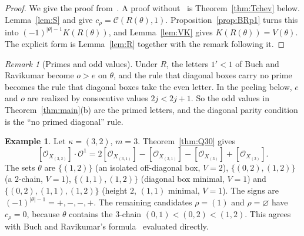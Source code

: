 \documentclass[11pt]{amsart}
\theoremstyle{definition}
\newtheorem{example}[theorem]{Example}
\theoremstyle{remark}
\newtheorem{remark}[theorem]{Remark}
\newcommand{\cO}{\mathcal{O}}
\newcommand{\cC}{\mathcal{C}}
\begin{document}
\begin{proof}
We give the proof from~\cite{BR12}. A proof without~\cite{BR12} is Theorem~\ref{thm:Tchev} below.
Lemma~\ref{lem:S} and \cite[Cor.~5.4]{BR12} give $c_\rho=\cC(R(\theta),1)$.
Proposition~\ref{prop:BRp1} turns this into $(-1)^{|\theta|-1}K(R(\theta))$, and
Lemma~\ref{lem:VK} gives $K(R(\theta))=V(\theta)$. The explicit form is Lemma~\ref{lem:R}
together with the remark following it.
\end{proof}

\begin{remark}[Primes and odd values]\label{rem:primes}
Under $R$, the letters $1'<1$ of Buch and Ravikumar become $o>e$ on $\theta$, and the rule that
diagonal boxes carry no prime becomes the rule that diagonal boxes take the even letter. In the
peeling below, $e$ and $o$ are realized by consecutive values $2j<2j+1$. So the odd values in
Theorem~\ref{thm:main}(b) are the primed letters, and the diagonal parity condition is the
``no primed diagonal'' rule.
\end{remark}

\begin{example}\label{ex:pieri32}
Let $\kappa=(3,2)$, $m=3$. Theorem~\ref{thm:Q30} gives
\[ [\cO_{X_{(3,2)}}]\cdot\cO^1=2[\cO_{X_{(3,1)}}]-[\cO_{X_{(2,1)}}]-[\cO_{X_{(3)}}]+[\cO_{X_{(2)}}]. \]
The sets $\theta$ are $\{(1,2)\}$ (an isolated off-diagonal box, $V=2$), $\{(0,2),(1,2)\}$
(a $2$-chain, $V=1$), $\{(1,1),(1,2)\}$ (diagonal box minimal, $V=1$) and
$\{(0,2),(1,1),(1,2)\}$ (height $2$, $(1,1)$ minimal, $V=1$). The signs are
$(-1)^{|\theta|-1}=+,-,-,+$. The remaining candidates $\rho=(1)$ and $\rho=\varnothing$ have
$c_\rho=0$, because $\theta$ contains the $3$-chain $(0,1)<(0,2)<(1,2)$. This agrees with Buch
and Ravikumar's formula~\cite[eq.~(11)]{BR12} evaluated directly.
\end{example}
\end{document}
